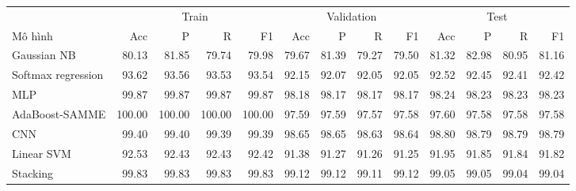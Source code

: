 \begin{tabular}{lrrrrrrrrrrrr}
\toprule
& \multicolumn{4}{c}{Train} & \multicolumn{4}{c}{Validation} & \multicolumn{4}{c}{Test} \\
\cmidrule(lr){2-5}\cmidrule(lr){6-9}\cmidrule(lr){10-13}
Mô hình & Acc & P & R & F1 & Acc & P & R & F1 & Acc & P & R & F1 \\
\midrule
Gaussian NB & 80.13 & 81.85 & 79.74 & 79.98 & 79.67 & 81.39 & 79.27 & 79.50 & 81.32 & 82.98 & 80.95 & 81.16 \\
Softmax regression & 93.62 & 93.56 & 93.53 & 93.54 & 92.15 & 92.07 & 92.05 & 92.05 & 92.52 & 92.45 & 92.41 & 92.42 \\
MLP & 99.87 & 99.87 & 99.87 & 99.87 & 98.18 & 98.17 & 98.17 & 98.17 & 98.24 & 98.23 & 98.23 & 98.23 \\
AdaBoost-SAMME & 100.00 & 100.00 & 100.00 & 100.00 & 97.59 & 97.59 & 97.57 & 97.58 & 97.60 & 97.58 & 97.58 & 97.58 \\
CNN & 99.40 & 99.40 & 99.39 & 99.39 & 98.65 & 98.65 & 98.63 & 98.64 & 98.80 & 98.79 & 98.79 & 98.79 \\
\midrule
Linear SVM & 92.53 & 92.43 & 92.43 & 92.42 & 91.38 & 91.27 & 91.26 & 91.25 & 91.95 & 91.85 & 91.84 & 91.82 \\
Stacking & 99.83 & 99.83 & 99.83 & 99.83 & 99.12 & 99.12 & 99.11 & 99.12 & 99.05 & 99.05 & 99.04 & 99.04 \\
\bottomrule
\end{tabular}
